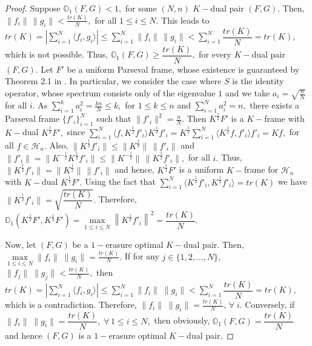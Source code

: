 \documentclass[final,1p,times]{elsarticle}
\begin{document}
\begin{proof}
	
	Suppose  $\mathbb{O}_{1}  (F,G) < 1,$\; for some $(N,n)$ $K-$dual pair $(F,G).$ Then, $ \|f_i\|\,\|g_i\| < \frac{tr(K)}{N} ,$ for all $1 \leq i \leq N.$ This leads to\, $tr(K)= \left|\sum\limits_{i=1}^N \langle f_i , g_i \rangle \right| \leq \sum\limits_{i=1}^N   \|f_i\|\,\|g_i\| < \sum\limits_{i=1}^N \dfrac{tr(K)}{N} = tr(K),$ \; which is not possible. Thus, $\mathbb{O}_{1}  (F,G) \geq\dfrac{tr(K)}{N},$ for every $K-$dual pair $(F,G)$.  Let $F'$ be a uniform Parseval frame, whose existence is guaranteed by Theorem 2.1 in \cite{cass2}. In particular, we consider the case where \( S \) is the identity operator, whose spectrum consists only of the eigenvalue \( 1 \) and we take \( a_i = \sqrt{\frac{n}{N}} \) for all \( i \).
 As $\sum\limits_{i=1}^k a_{i}^2 = \frac{kn}{N} \leq k,$ for $ 1\leq k \leq n$ and  $\sum\limits_{i=1}^N a_{i}^2 = n,$ there exists a Parseval frame $\{f'_i\}_{i=1}^N$ such that $\| f'_i\|^2 = \frac{n}{N}.$ Then $K^{\frac{1}{2}}F'$ is a $K-$frame with $K-$dual $K^{\frac{1}{2}}F',$ since $\sum\limits_{i=1}^N \langle f, K^{\frac{1}{2}}f'_i \rangle K^{\frac{1}{2}}f'_i = K^{\frac{1}{2}} \sum\limits_{i=1}^N \langle K^{\frac{1}{2}}f, f'_i \rangle f'_i =Kf,$ for all $f \in \mathcal{H}_n.$ Also, $\|K^{\frac{1}{2}} f'_i\| \leq \|K^{\frac{1}{2}}\|\,\|f'_i\|$ and $\|f'_i\| = \|K^{-\frac{1}{2}} K^{\frac{1}{2}} f'_i \| \leq \|K^{-\frac{1}{2}}\|\,\|K^{\frac{1}{2}} f'_i\|,$ for all $i.$ Thus, $\|K^{\frac{1}{2}} f'_i\| = \|K^{\frac{1}{2}}\|\,\|f'_i\|$ and hence, $K^{\frac{1}{2}}F'$ is a uniform  $K-$frame for $\mathcal{H}_n$ with $K-$dual $K^{\frac{1}{2}}F'.$ Using the fact that  $\sum\limits_{i=1}^N \langle K^{\frac{1}{2}} f'_i , K^{\frac{1}{2}} f'_i \rangle = tr (K)$ we have $\| K^{\frac{1}{2}}f'_i\| = \sqrt{\dfrac{tr(K)}{N}}.$ Therefore, $\mathbb{O}_{1}  (K^{\frac{1}{2}}F',K^{\frac{1}{2}}F') = \max\limits_{1 \leq i \leq N} \left\| K^{\frac{1}{2}}f'_i \right\|^2  = \dfrac{tr(K)}{N}.$
    
    \par  Now, let $(F,G) $ be a $1-$erasure optimal $K-$dual pair.  Then, $\max\limits_{1 \leq i \leq N}  \|f_i\|\;\|g_i \| = \frac{tr(K)}{N}.$ If for any $j \in \{1,2,\ldots,N\},$ $ \|f_j\|\;\|g_j  \| < \frac{tr(K)}{N},$  then $tr(K) = \left|\sum\limits_{i=1}^N \langle f_i, g_i \rangle \right|  \leq \sum\limits_{i=1}^N \|f_i\|\;\|g_i \| < \sum\limits_{i=1}^N \dfrac{tr(K)}{N} =tr(K) ,$ which is a contradiction.	Therefore, $ \|f_i\|\;\|g_i \| = \frac{tr(K)}{N},\, \forall\; i.$ Conversely, if   $\|f_i\|\;\|g_i\| = \dfrac{tr(K)}{N},\;\forall \,1 \leq i \leq N,$ then obviously, $\mathbb{O}_{1} (F,G) = \dfrac{tr(K)}{N}$ and hence $(F,G) $ is a $1-$erasure optimal $K-$dual pair.
	
\end{proof}
\end{document}
